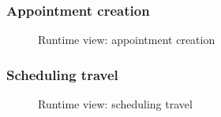 \subsubsection{Appointment creation}
	\begin{figure}[!h]
		\centering
		\caption{Runtime view: appointment creation}
	\end{figure}
	\clearpage
\subsubsection{Scheduling travel}
	\begin{figure}[!h]
		\centering
		\caption{Runtime view: scheduling travel}
	\end{figure}
	\clearpage
